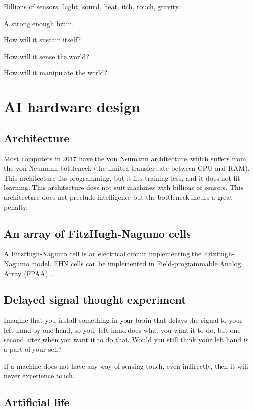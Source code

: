 Billions of sensors.
Light, sound, heat, itch, touch, gravity.

A strong enough brain.

How will it sustain itself?

How will it sense the world?

How will it manipulate the world?

\chapter{AI hardware design}

\section{Architecture}

Most computers in 2017 have the von Neumann architecture,
which suffers from the von Neumann bottleneck
(the limited transfer rate between CPU and RAM).
This architecture fits programming,
but it fits training less,
and it does not fit learning.
This architecture does not suit machines with billions of sensors.
This architecture does not preclude intelligence
but the bottleneck incurs a great penalty.

\section{An array of FitzHugh-Nagumo cells}

A FitzHugh-Nagumo cell is an electrical circuit implementing the FitzHugh-Nagumo model.
FHN cells can be implemented in Field-programmable Analog Array (FPAA) \cite{CircuitFitzHughNagumo}.

\section{Delayed signal thought experiment}

Imagine that you install something in your brain that delays the signal to your left hand by one hand,
so your left hand does what you want it to do, but one second after when you want it to do that.
Would you still think your left hand is a part of your self?

If a machine does not have any way of sensing touch, even indirectly,
then it will never experience touch.

\section{Artificial life}

